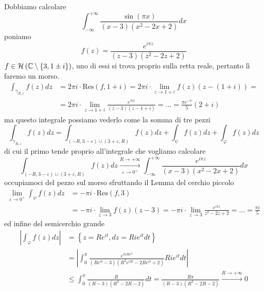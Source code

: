 Dobbiamo calcolare
\begin{equation*}
\int ^{+\infty }_{-\infty }\frac{\sin\left( \pi x\right)}{\left( x-3\right)\left( x^{2} -2x+2\right)} dx
\end{equation*}
poniamo
\begin{equation*}
f\left( z\right) =\frac{e^{i\pi z}}{\left( z-3\right)\left( z^{2} -2z+2\right)}
\end{equation*}
$f\in \mathcal{H} \left(\mathbb{C} \setminus \left\{3,1\pm i\right\}\right)$, uno di essi si trova proprio sulla retta reale, pertanto lì faremo un morso.
\begin{align*}
\int _{\gamma _{R,\varepsilon }} f\left( z\right) dz & =2\pi i\cdotp \mathrm{Res}\left( f,1+i\right) =2\pi i\cdotp \lim _{z\rightarrow 1+i} f\left( z\right)\left( z-\left( 1+i\right)\right) =\\
 & =2\pi i\cdotp \lim _{z\rightarrow 1+i}\frac{e^{\pi iz}}{\left( z-3\right)\left( z-1+i\right)} =\dotsc =\frac{\pi e^{-\pi }}{5}\left( 2+i\right)
\end{align*}
ma questo integrale possiamo vederlo come la somma di tre pezzi
\begin{equation*}
\int _{\gamma _{R,\varepsilon }} f\left( z\right) dz=\int _{\left( -R,3-\varepsilon \right) \cup \left( 3+\varepsilon ,R\right)} f\left( z\right) dz+\int _{\psi } f\left( z\right) dz+\int _{\varphi } f\left( z\right) dz
\end{equation*}
di cui il primo tende proprio all'integrale che vogliamo calcolare
\begin{equation*}
\int _{\left( -R,3-\varepsilon \right) \cup \left( 3+\varepsilon ,R\right)} f\left( z\right) dz\xrightarrow[\varepsilon \rightarrow 0^{+}]{R\rightarrow +\infty }\int ^{+\infty }_{-\infty }\frac{e^{i\pi z}}{\left( x-3\right)\left( x^{2} -2x+2\right)} dx
\end{equation*}
occupiamoci del pezzo sul morso sfruttando il Lemma del cerchio piccolo
\begin{align*}
\lim _{\varepsilon \rightarrow 0^{+}}\int _{\psi } f\left( z\right) dz & =-\pi i\cdotp \mathrm{Res}\left( f,3\right)\\
 & =-\pi i\cdotp \lim _{z\rightarrow 3} f\left( z\right)\left( z-3\right) =-\pi i\cdotp \lim _{z\rightarrow 3}\frac{e^{i\pi z}}{z^{2} -2z+2} =\dotsc =\frac{\pi i}{5}
\end{align*}
ed infine del semicerchio grande
\begin{align*}
\left| \int _{\varphi } f\left( z\right) dz\right|  & =\left\{z=Re^{it} ,dz=Rie^{it} dt\right\}\\
 & =\left| \int ^{\pi }_{0}\frac{e^{\pi iRe^{it}}}{\left( Re^{it} -3\right)\left( R^{2} e^{i2t} -2Re^{it} +2\right)} Rie^{it} dt\right| \\
 & \leqslant \int ^{\pi }_{0}\frac{R}{\left( R-3\right)\left( R^{2} -2R-2\right)} dt=\frac{R\pi }{\left( R-3\right)\left( R^{2} -2R-2\right)}\xrightarrow{R\rightarrow +\infty } 0
\end{align*}
